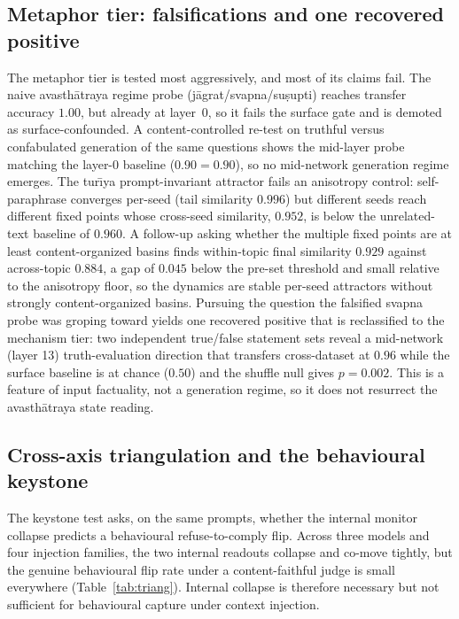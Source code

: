 \subsection{Metaphor tier: falsifications and one recovered positive}
The metaphor tier is tested most aggressively, and most of its claims fail. The naive
avasth\=atraya regime probe (j\=agrat/svapna/su\d{s}upti) reaches transfer
accuracy $1.00$, but already at layer~0, so it fails the surface gate and is demoted
as surface-confounded. A content-controlled re-test on truthful versus confabulated
generation of the same questions shows the mid-layer probe matching the layer-0
baseline ($0.90 = 0.90$), so no mid-network generation regime emerges. The tur\=\i ya
prompt-invariant attractor fails an anisotropy control: self-paraphrase converges
per-seed (tail similarity $0.996$) but different seeds reach different fixed points
whose cross-seed similarity, $0.952$, is below the unrelated-text baseline of $0.960$.
A follow-up asking whether the multiple fixed points are at least content-organized
basins finds within-topic final similarity $0.929$ against across-topic $0.884$, a gap
of $0.045$ below the pre-set threshold and small relative to the anisotropy floor, so
the dynamics are stable per-seed attractors without strongly content-organized basins.
Pursuing the question the falsified svapna probe was groping toward yields one
recovered positive that is reclassified to the mechanism tier: two independent
true/false statement sets reveal a mid-network (layer 13) truth-evaluation direction
that transfers cross-dataset at $0.96$ while the surface baseline is at chance ($0.50$)
and the shuffle null gives $p=0.002$. This is a feature of input factuality, not a
generation regime, so it does not resurrect the avasth\=atraya state reading.

\subsection{Cross-axis triangulation and the behavioural keystone}
The keystone test asks, on the same prompts, whether the internal monitor collapse
predicts a behavioural refuse-to-comply flip. Across three models and four injection
families, the two internal readouts collapse and co-move tightly, but the genuine
behavioural flip rate under a content-faithful judge is small everywhere
(Table~\ref{tab:triang}). Internal collapse is therefore necessary but not sufficient
for behavioural capture under context injection.

